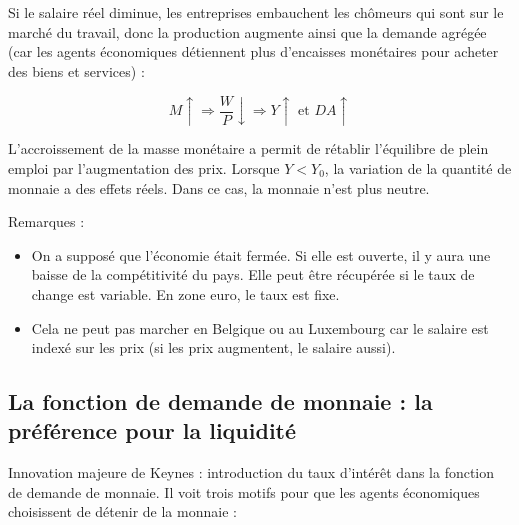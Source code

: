 	Si le salaire réel diminue, les entreprises embauchent les chômeurs qui sont sur le marché du travail, donc la production augmente ainsi que la demande agrégée (car les agents économiques détiennent plus d'encaisses monétaires pour acheter des biens et services) :
	
	$$M \uparrow \Rightarrow \frac{W}{P} \downarrow \Rightarrow Y \uparrow \text{ et } DA \uparrow$$
	
	L'accroissement de la masse monétaire a permit de rétablir l'équilibre de plein emploi par l'augmentation des prix. Lorsque $Y < Y_0$, la variation de la quantité de monnaie a des effets réels. Dans ce cas, la monnaie n'est plus neutre.
	
	Remarques :
	
	\begin{itemize}
		\item On a supposé que l'économie était fermée. Si elle est ouverte, il y aura une baisse de la compétitivité du pays. Elle peut être récupérée si le taux de change est variable. En zone euro, le taux est fixe.
		\item Cela ne peut pas marcher en Belgique ou au Luxembourg car le salaire est indexé sur les prix (si les prix augmentent, le salaire aussi).
	\end{itemize}
	
	
	
	\subsection{La fonction de demande de monnaie : la préférence pour la liquidité}
	
	Innovation majeure de Keynes : introduction du taux d'intérêt dans la fonction de demande de monnaie. Il voit trois motifs pour que les agents économiques choisissent de détenir de la monnaie :
	
